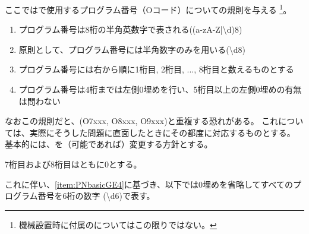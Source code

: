

ここでは\DMC で使用するプログラム番号（Oコード）についての規則を与える
\footnote{機械設置時に付属の\bundledNCPrg についてはこの限りではない。}。



\begin{enumerate}[label=\Roman*., ref=\Roman*]
\item プログラム番号は8桁の半角英数字で表される({\ttfamily(a-zA-Z|\textbackslash d){8}})
\item 原則として、プログラム番号には半角数字のみを用いる({\ttfamily\textbackslash d{8}})
\item プログラム番号には右から順に1桁目, 2桁目, ..., 8桁目と数えるものとする
\item\label{item:PNbasicGE4}プログラム番号は4桁までは左側0埋めを行い、5桁目以上の左側0埋めの有無は問わない
\end{enumerate}
\begin{hosoku}
なおこの規則だと、\bundledNCPrg(O7xxx, O8xxx, O9xxx)と重複する恐れがある。
これについては、実際にそうした問題に直面したときにその都度に対応するものとする。
基本的には、\bundledNCPrg を（可能であれば）変更する方針とする。
\end{hosoku}


7桁目および8桁目はともに0とする。

これに伴い、\ref{item:PNbasicGE4}に基づき、以下では0埋めを省略してすべてのプログラム番号を6桁の数字 ({\ttfamily\textbackslash d{6}})で表す。



